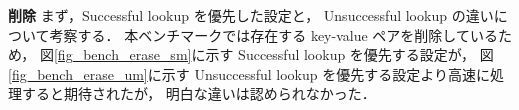 %
{\bf 削除}
\samepage\newline\indent
まず，Successful lookup を優先した設定と，
Unsuccessful lookup の違いについて考察する．
本ベンチマークでは存在する key-value ペアを削除しているため，
図\ref{fig_bench_erase_sm}に示す Successful lookup を優先する設定が，
図\ref{fig_bench_erase_um}に示す Unsuccessful lookup を優先する設定より高速に処理すると期待されたが，
明白な違いは認められなかった．
\leavevmode \newline



